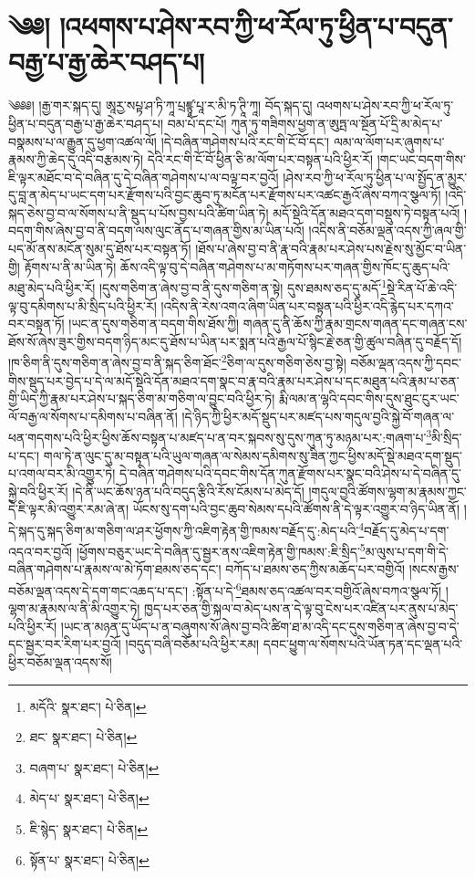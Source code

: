 \setcounter{footnote}{0} 
\chapter{༄༅། །འཕགས་པ་ཤེས་རབ་ཀྱི་ཕ་རོལ་ཏུ་ཕྱིན་པ་བདུན་བརྒྱ་པ་རྒྱ་ཆེར་བཤད་པ།}༄༅༅། །རྒྱ་གར་སྐད་དུ། ཨཱརྱ་སཔྟ་ཤ་ཏི་ཀཱ་པྲཛྙཱ་པཱ་ར་མི་ཏ་ཊཱི་ཀཱ། བོད་སྐད་དུ། འཕགས་པ་ཤེས་རབ་ཀྱི་ཕ་རོལ་ཏུ་ཕྱིན་པ་བདུན་བརྒྱ་པ་རྒྱ་ཆེར་བཤད་པ། བམ་པོ་དང་པོ། ཀུན་ཏུ་གཟིགས་ཕྱག་ན་ཨུཏྤ་ལ་སྔོན་པོ་དྲི་མ་མེད་པ་བསྣམས་པ་ལ་རྒྱུན་དུ་ཕྱག་འཚལ་ལོ། །དེ་བཞིན་གཤེགས་པའི་རང་གི་ངོ་བོ་དང་། ལམ་ལ་ལོག་པར་ཞུགས་པ་རྣམས་ཀྱི་ཆེད་དུ་འདི་བརྩམས་ཏེ། དེའི་རང་གི་ངོ་བོ་ཕྱིན་ཅི་མ་ལོག་པར་བསྟན་པའི་ཕྱིར་རོ། །གང་ཡང་བདག་གིས་ཇི་ལྟར་མཐོང་བ་དེ་བཞིན་དུ་དེ་བཞིན་གཤེགས་པ་ལ་བལྟ་བར་བྱའོ། །ཤེས་རབ་ཀྱི་ཕ་རོལ་ཏུ་ཕྱིན་པ་ལ་སྤྱོད་ན་མྱུར་དུ་བླ་ན་མེད་པ་ཡང་དག་པར་རྫོགས་པའི་བྱང་ཆུབ་ཏུ་མངོན་པར་རྫོགས་པར་འཚང་རྒྱའོ་ཞེས་བཀའ་སྩལ་ཏོ། །འདི་སྐད་ཅེས་བྱ་བ་ལ་སོགས་པ་ནི་སྡུད་པ་པོས་བྱས་པའི་ཚིག་ཡིན་ཏེ། མདོ་སྡེའི་དོན་མཐའ་དག་བསྡུས་ཏེ་བསྟན་པའོ། །བདག་གིས་ཞེས་བྱ་བ་ནི་བདག་ལས་ལུང་ནོད་པ་གཞན་གྱིས་མ་ཡིན་པའོ། །འདིས་ནི་བཅོམ་ལྡན་འདས་ཀྱི་ཞལ་གྱི་པད་མོ་ནས་མངོན་སུམ་དུ་ཐོས་པར་བསྟན་ཏོ། །ཐོས་པ་ཞེས་བྱ་བ་ནི་རྣ་བའི་རྣམ་པར་ཤེས་པས་རྗེས་སུ་མྱོང་བ་ཡིན་གྱི། རྟོགས་པ་ནི་མ་ཡིན་ཏེ། ཆོས་འདི་ལྟ་བུ་དེ་བཞིན་གཤེགས་པ་མ་གཏོགས་པར་གཞན་གྱིས་ཁོང་དུ་ཆུད་པའི་མཐུ་མེད་པའི་ཕྱིར་རོ། །དུས་གཅིག་ན་ཞེས་བྱ་བ་ནི་དུས་གཅིག་ན་སྟེ། དུས་ཐམས་ཅད་དུ་མདོ་\footnote{མདོའི་  སྣར་ཐང་།  པེ་ཅིན། }སྡེ་རིན་པོ་ཆེ་འདི་ལྟ་བུ་དམིགས་པ་མི་སྲིད་པའི་ཕྱིར་རོ། །འདིས་ནི་རེས་འགའ་ཞིག་ཡིན་པར་བསྟན་པའི་ཕྱིར་འདི་རྙེད་པར་དཀའ་བར་བསྟན་ཏོ། །ཡང་ན་དུས་གཅིག་ན་བདག་གིས་ཐོས་ཀྱི། གཞན་དུ་ནི་ཆོས་ཀྱི་རྣམ་གྲངས་གཞན་དང་གཞན་ངས་ཐོས་སོ་ཞེས་ཟུར་གྱིས་བདག་ཉིད་མང་དུ་ཐོས་པ་ཡིན་པར་སྨན་པའི་རྒྱལ་པོ་སྙིང་རྗེ་ཅན་གྱི་ཚུལ་བཞིན་དུ་བརྗོད་དོ། །ཁ་ཅིག་ནི་དུས་གཅིག་ན་ཞེས་བྱ་བ་ནི་སྐད་ཅིག་ཐོང་\footnote{ཐང་  སྣར་ཐང་།  པེ་ཅིན། }ཅིག་ལ་དུས་གཅིག་ཅེས་བྱ་སྟེ། བཅོམ་ལྡན་འདས་ཀྱི་དབང་གིས་སྡུད་པར་བྱེད་པ་དེ་ལ་མདོ་སྡེའི་དོན་མཐའ་དག་སྣང་བ་རྣ་བའི་རྣམ་པར་ཤེས་པ་དང་མཐུན་པའི་རྣམ་པ་ཅན་གྱི་ཡིད་ཀྱི་རྣམ་པར་ཤེས་པ་སྐད་ཅིག་མ་གཅིག་ལ་བྱུང་བའི་ཕྱིར་ཏེ། རྨི་ལམ་ན་ལྷའི་དབང་གིས་དུས་ཐུང་ངུར་ཡང་ལོ་བརྒྱ་ལ་སོགས་པ་དམིགས་པ་བཞིན་ནོ། །དེ་ཉིད་ཀྱི་ཕྱིར་མདོ་སྡུད་པར་མཛད་པས་གདུལ་བྱའི་སྐྱེ་བོ་གཞན་ལ་ཕན་གདགས་པའི་ཕྱིར་ཕྱིས་ཆོས་བསྟན་པ་མཛད་པ་ན་བར་སྐབས་སུ་དུས་ཀུན་ཏུ་མཉམ་པར་:གཞག་པ་\footnote{བཞག་པ་  སྣར་ཐང་།  པེ་ཅིན། }མི་སྲིད་པ་དང་། གལ་ཏེ་ན་ལུང་དུ་མ་བསྟན་པའི་ཡུལ་གཞན་ལ་སེམས་དམིགས་སུ་ཟིན་ཀྱང་ཕྱིས་མདོ་སྡེ་མཐའ་དག་སྡུད་པ་འགལ་བར་མི་འགྱུར་ཏེ། དེ་བཞིན་གཤེགས་པའི་དབང་གིས་དོན་ཀུན་རྫོགས་པར་སྣང་བའི་ཤེས་པ་དེ་བཞིན་དུ་སྐྱེ་བའི་ཕྱིར་རོ། །དེ་ནི་ཡང་ཆོས་ཉན་པའི་བདུད་རྩིའི་རོས་ངོམས་པ་མེད་དོ། །གདུལ་བྱའི་ཚོགས་ལྷག་མ་རྣམས་ཀྱང་དེ་ཇི་ལྟར་མི་འགྱུར་རམ་ཞེ་ན། ཡོངས་སུ་དག་པའི་བྱང་ཆུབ་སེམས་དཔའི་ཚོགས་ནི་དེ་ལྟར་འགྱུར་བ་ཉིད་ཡིན་ནོ། །དེ་སྐད་དུ་སྐད་ཅིག་མ་གཅིག་ལ་ཤར་ཕྱོགས་ཀྱི་འཇིག་རྟེན་གྱི་ཁམས་བརྗོད་དུ་:མེད་པའི་\footnote{མེད་པ་  སྣར་ཐང་།  པེ་ཅིན། }བརྗོད་དུ་མེད་པ་དག་འདའ་བར་བྱའོ། །ཕྱོགས་བཅུར་ཡང་དེ་བཞིན་དུ་སྦྱར་ནས་འཇིག་རྟེན་གྱི་ཁམས་:ཇི་སྲིད་\footnote{ཇི་སྙེད་  སྣར་ཐང་།  པེ་ཅིན། }མ་ལུས་པ་དག་གི་དེ་བཞིན་གཤེགས་པ་རྣམས་ལ་མེ་ཏོག་ཐམས་ཅད་དང་། བཀོད་པ་ཐམས་ཅད་ཀྱིས་མཆོད་པར་བགྱིའོ། །སངས་རྒྱས་བཅོམ་ལྡན་འདས་དེ་དག་གང་འཆད་པ་དང་། :སྟོན་པ་དེ་\footnote{སྟོན་པ་  སྣར་ཐང་།  པེ་ཅིན། }ཐམས་ཅད་འཚལ་བར་བགྱིའོ་ཞེས་བཀའ་སྩལ་ཏོ། །ལྷག་མ་རྣམས་ལ་ནི་མི་འགྱུར་ཏེ། ཁྱད་པར་ཅན་གྱི་སྐལ་བ་མེད་པས་ན་དེ་ལྟ་བུ་ངེས་པར་འཛིན་པར་ནུས་པ་མེད་པའི་ཕྱིར་རོ། །ཡང་ན་མཉན་དུ་ཡོད་པ་ན་བཞུགས་སོ་ཞེས་བྱ་བའི་ཚིག་ཐ་མ་འདི་དང་དུས་གཅིག་ན་ཞེས་བྱ་བ་དེ་དང་སྦྱར་བར་རིག་པར་བྱའོ། །བདུད་བཞི་བཅོམ་པའི་ཕྱིར་རམ། དབང་ཕྱུག་ལ་སོགས་པའི་ཡོན་ཏན་དང་ལྡན་པའི་ཕྱིར་བཅོམ་ལྡན་འདས་སོ། 